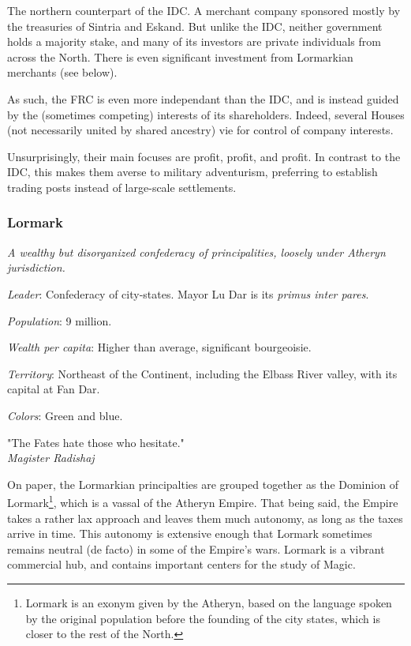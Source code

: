 The northern counterpart of the IDC. A merchant company sponsored mostly by the treasuries of Sintria and Eskand. But unlike the IDC, neither government holds a majority stake, and many of its investors are private individuals from across the North. There is even significant investment from Lormarkian merchants (see below).

As such, the FRC is even more independant than the IDC, and is instead guided by the (sometimes competing) interests of its shareholders. Indeed, several Houses (not necessarily united by shared ancestry) vie for control of company interests.

Unsurprisingly, their main focuses are profit, profit, and profit. In contrast to the IDC, this makes them averse to military adventurism, preferring to establish trading posts instead of large-scale settlements.



\subsubsection{Lormark}

\textit{A wealthy but disorganized confederacy of principalities, loosely under Atheryn jurisdiction.}

\textit{Leader}: Confederacy of city-states. Mayor Lu Dar is its \textit{primus inter pares}.

\textit{Population}: 9 million.

\textit{Wealth per capita}: Higher than average, significant bourgeoisie.

\textit{Territory}: Northeast of the Continent, including the Elbass River valley, with its capital at Fan Dar.
    
\textit{Colors}: Green and blue.


\begin{rpg-quotebox}
"The Fates hate those who hesitate." \\ \textendash \textit{Magister Radishaj}
\end{rpg-quotebox}


On paper, the Lormarkian principalties are grouped together as the Dominion of Lormark\footnote{Lormark is an exonym given by the Atheryn, based on the language spoken by the original population before the founding of the city states, which is closer to the rest of the North.}, which is a vassal of the Atheryn Empire. That being said, the Empire takes a rather lax approach and leaves them much autonomy, as long as the taxes arrive in time. This autonomy is extensive enough that Lormark sometimes remains neutral (de facto) in some of the Empire's wars. Lormark is a vibrant commercial hub, and contains important centers for the study of Magic.

